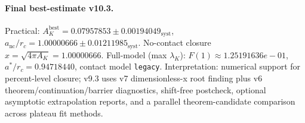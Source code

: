 \paragraph{Final best-estimate v10.3.}
Practical: $A_K^{\mathrm{best}} = 0.07957853 \pm 0.00194049_{\mathrm{syst}}$, $a_{\mathrm{nc}}/r_c = 1.00000666 \pm 0.01211985_{\mathrm{syst}}$.
No-contact closure $x = \sqrt{4\pi A_K} = 1.00000666$.
Full-model (max $\lambda_K$): $F(1) \approx 1.25191636e-01$, $a^*/r_c = 0.94718440$, contact model \texttt{legacy}.
Interpretation: numerical support for percent-level closure; v9.3 uses v7 dimensionless-x root finding plus v6 theorem/continuation/barrier diagnostics, shift-free postcheck, optional asymptotic extrapolation reports, and a parallel theorem-candidate comparison across plateau fit methods.
